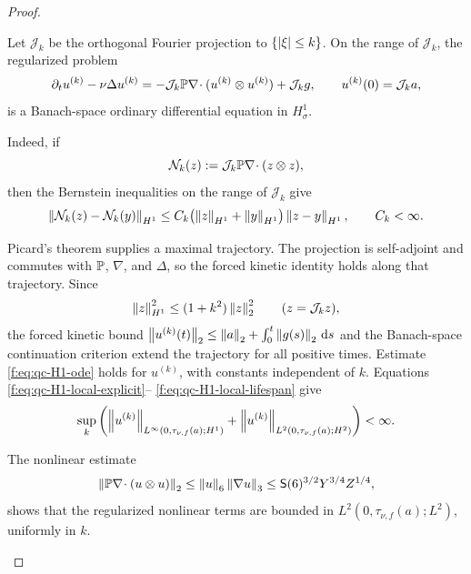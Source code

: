 \begin{proof}
\begin{samepage}
Let \(\mathcal J_k\) be the orthogonal Fourier projection to
\(\{\left|\xi\right|\le k\}\).  On the range of \(\mathcal J_k\), the regularized
problem
\begin{equation}
 \partial_tu^{(k)}-\nu\Delta u^{(k)}
 =-\mathcal J_k\mathbb P\nabla\!\cdot
   (u^{(k)}\otimes u^{(k)})+\mathcal J_kg,
 \qquad u^{(k)}(0)=\mathcal J_ka,
 \label{f:eq:qc-H1-Friedrichs-system}
\end{equation}
is a Banach-space ordinary differential equation in \(H^1_\sigma\).
\end{samepage}
\begin{samepage}
Indeed, if
\[
 \mathcal N_k(z):=\mathcal J_k\mathbb P\nabla\!\cdot(z\otimes z),
\]
then the Bernstein inequalities on the range of \(\mathcal J_k\) give
\begin{equation}
 \left\lVert \mathcal N_k(z)-\mathcal N_k(y)\right\rVert_{H^1}
 \le C_k\bigl(\left\lVert z\right\rVert_{H^1}+\left\lVert y\right\rVert_{H^1}\bigr)
       \left\lVert z-y\right\rVert_{H^1},
 \qquad C_k<\infty.
 \label{f:eq:qc-H1-Friedrichs-Lipschitz}
\end{equation}
\end{samepage}
Picard's theorem supplies a maximal trajectory.  The projection is
self-adjoint and commutes with \(\mathbb P\), \(\nabla\), and \(\Delta\), so the
forced kinetic identity holds along that trajectory.  Since
\begin{equation}
 \left\lVert z\right\rVert_{H^1}^2\le(1+k^2)\left\lVert z\right\rVert_2^2
 \qquad(z=\mathcal J_kz),
 \label{f:eq:qc-H1-Friedrichs-band-control}
\end{equation}
the forced kinetic bound \(\left\lVert u^{(k)}(t)\right\rVert_2\le
\left\lVert a\right\rVert_2+\int_0^t\left\lVert g(s)\right\rVert_2\,\mathrm d s\) and the Banach-space continuation criterion extend the
trajectory for all positive times.  Estimate
\eqref{f:eq:qc-H1-ode} holds for \(u^{(k)}\), with constants independent of
\(k\).  Equations \eqref{f:eq:qc-H1-local-explicit}--%
\eqref{f:eq:qc-H1-local-lifespan} give
\begin{equation}
 \sup_k\left(
 \left\lVert u^{(k)}\right\rVert_{L^\infty(0,\tau_{\nu,f}(a);H^1)}
 +\left\lVert u^{(k)}\right\rVert_{L^2(0,\tau_{\nu,f}(a);H^2)}
 \right)<\infty.
 \label{f:eq:qc-H1-Friedrichs-uniform}
\end{equation}
\begin{samepage}
The nonlinear estimate
\[
 \left\lVert \mathbb P\nabla\!\cdot(u\otimes u)\right\rVert_2
 \le \left\lVert u\right\rVert_6\left\lVert \nabla u\right\rVert_3
 \le \mathsf S(6)^{3/2}Y^{3/4}Z^{1/4},
\]
shows that the regularized nonlinear terms are bounded in
\(L^2(0,\tau_{\nu,f}(a);L^2)\), uniformly in \(k\).
\par
\end{samepage}

\end{proof}
